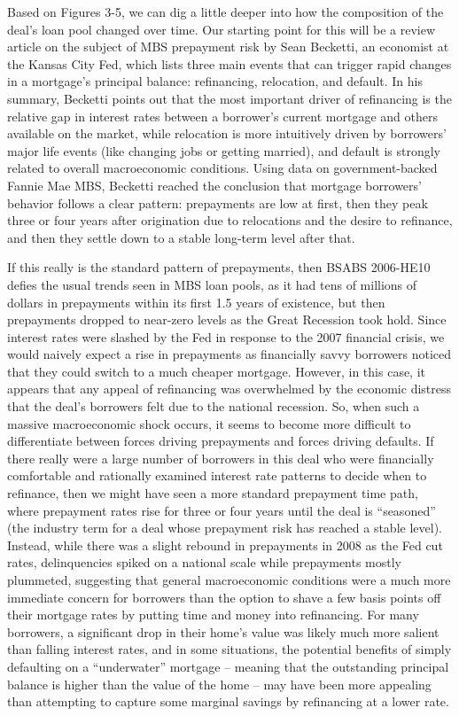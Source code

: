 \documentclass[12pt]{article}
\begin{document}
	Based on Figures 3-5, we can dig a little deeper into how the composition of the deal’s loan pool changed over time. Our starting point for this will be a review article on the subject of MBS prepayment risk by Sean Becketti, an economist at the Kansas City Fed, which lists three main events that can trigger rapid changes in a mortgage’s principal balance: refinancing, relocation, and default. In his summary, Becketti points out that the most important driver of refinancing is the relative gap in interest rates between a borrower’s current mortgage and others available on the market, while relocation is more intuitively driven by borrowers’ major life events (like changing jobs or getting married), and default is strongly related to overall macroeconomic conditions. Using data on government-backed Fannie Mae MBS, Becketti reached the conclusion that mortgage borrowers’ behavior follows a clear pattern: prepayments are low at first, then they peak three or four years after origination due to relocations and the desire to refinance, and then they settle down to a stable long-term level after that.
	
If this really is the standard pattern of prepayments, then BSABS 2006-HE10 defies the usual trends seen in MBS loan pools, as it had tens of millions of dollars in prepayments within its first 1.5 years of existence, but then prepayments dropped to near-zero levels as the Great Recession took hold. Since interest rates were slashed by the Fed in response to the 2007 financial crisis, we would naively expect a rise in prepayments as financially savvy borrowers noticed that they could switch to a much cheaper mortgage. However, in this case, it appears that any appeal of refinancing was overwhelmed by the economic distress that the deal’s borrowers felt due to the national recession. So, when such a massive macroeconomic shock occurs, it seems to become more difficult to differentiate between forces driving prepayments and forces driving defaults. If there really were a large number of borrowers in this deal who were financially comfortable and rationally examined interest rate patterns to decide when to refinance, then we might have seen a more standard prepayment time path, where prepayment rates rise for three or four years until the deal is “seasoned” (the industry term for a deal whose prepayment risk has reached a stable level). Instead, while there was a slight rebound in prepayments in 2008 as the Fed cut rates, delinquencies spiked on a national scale while prepayments mostly plummeted, suggesting that general macroeconomic conditions were a much more immediate concern for borrowers than the option to shave a few basis points off their mortgage rates by putting time and money into refinancing. For many borrowers, a significant drop in their home’s value was likely much more salient than falling interest rates, and in some situations, the potential benefits of simply defaulting on a “underwater” mortgage – meaning that the outstanding principal balance is higher than the value of the home – may have been more appealing than attempting to capture some marginal savings by refinancing at a lower rate.
\end{document}
